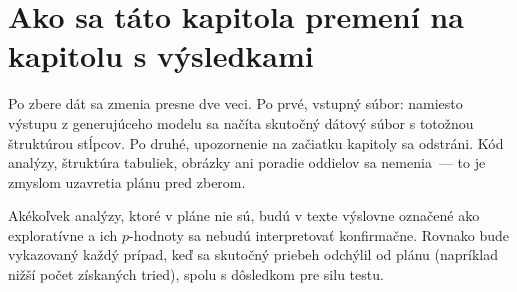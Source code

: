 \section{Ako sa táto kapitola premení na kapitolu s výsledkami}

Po zbere dát sa zmenia presne dve veci. Po prvé, vstupný súbor: namiesto výstupu z generujúceho modelu sa načíta skutočný dátový súbor s totožnou štruktúrou stĺpcov. Po druhé, upozornenie na začiatku kapitoly sa odstráni. Kód analýzy, štruktúra tabuliek, obrázky ani poradie oddielov sa nemenia~--- to je zmyslom uzavretia plánu pred zberom.

Akékoľvek analýzy, ktoré v pláne nie sú, budú v texte výslovne označené ako exploratívne a ich $p$-hodnoty sa nebudú interpretovať konfirmačne. Rovnako bude vykazovaný každý prípad, keď sa skutočný priebeh odchýlil od plánu (napríklad nižší počet získaných tried), spolu s dôsledkom pre silu testu.
